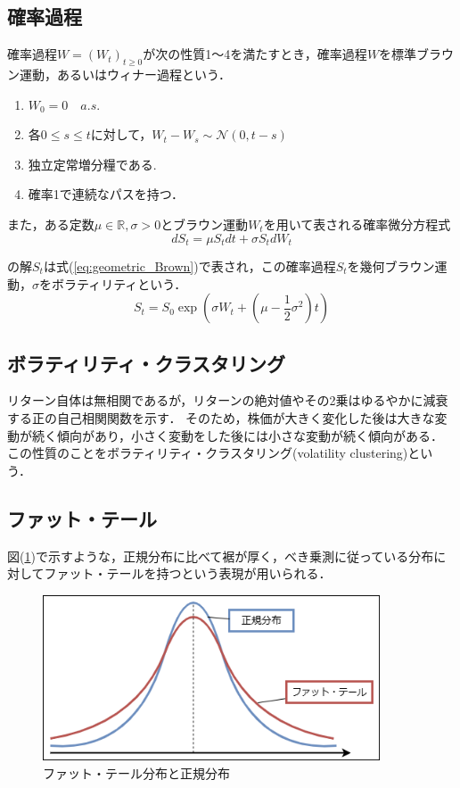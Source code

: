 \documentclass[titlepage]{jsreport}
\begin{document}
\subsection{確率過程}
確率過程$W = (W_t)_{t \geq 0}$が次の性質1～4を満たすとき，確率過程$W$を標準ブラウン運動，あるいはウィナー過程という\cite{stochastic_integration}．
\begin{enumerate}
    \item $W_0 = 0 \quad a.s.$
    \item 各$0 \leq s \leq t$に対して，$W_t - W_s \sim \mathcal{N}(0, t - s)$
    \item 独立定常増分糧である.
    \item 確率1で連続なパスを持つ．
\end{enumerate}

また，ある定数$\mu \in \mathbb{R}, \sigma > 0$とブラウン運動$W_t$を用いて表される確率微分方程式
\begin{equation}
    dS_t = \mu S_t dt + \sigma S_t dW_t \label{eq:geoBrow_equation}
\end{equation}

の解$S_t$は式(\ref{eq:geometric_Brown})で表され，この確率過程$S_t$を幾何ブラウン運動，$\sigma$をボラティリティという\cite{Stochastic_Calculus}．
\begin{equation}
    S_t = S_0 \exp{\left(\sigma W_t + \left( \mu - \frac{1}{2}\sigma^2 \right)t\right)} \label{eq:geometric_Brown}
\end{equation}

\subsection{ボラティリティ・クラスタリング}
リターン自体は無相関であるが，リターンの絶対値やその2乗はゆるやかに減衰する正の自己相関関数を示す\cite{Cont2007}．
そのため，株価が大きく変化した後は大きな変動が続く傾向があり，小さく変動をした後には小さな変動が続く傾向がある\cite{return_correlation}．
この性質のことをボラティリティ・クラスタリング(volatility clustering)という．

\subsection{ファット・テール}
図(\ref{fig:fat_tail})で示すような，正規分布に比べて裾が厚く，べき乗測に従っている分布に対してファット・テールを持つという表現が用いられる\cite{fat-tailed}．
\begin{figure}[htbp]
    \centering
    \includegraphics[width=10cm]{fig/fat_tail.png}
    \caption{ファット・テール分布と正規分布}
    \label{fig:fat_tail}
\end{figure}
\end{document}
